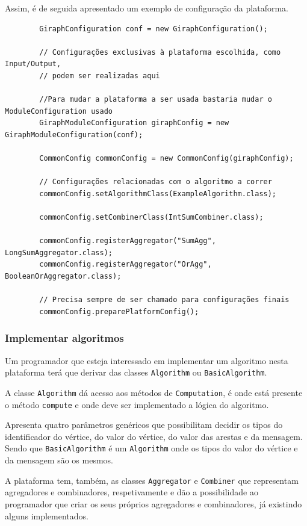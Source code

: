Assim, é de seguida apresentado um exemplo de configuração da plataforma.

\begin{verbatim}
		GiraphConfiguration conf = new GiraphConfiguration();

		// Configurações exclusivas à plataforma escolhida, como Input/Output, 
		// podem ser realizadas aqui
		
		//Para mudar a plataforma a ser usada bastaria mudar o ModuleConfiguration usado
		GiraphModuleConfiguration giraphConfig = new GiraphModuleConfiguration(conf);
		
		CommonConfig commonConfig = new CommonConfig(giraphConfig);
		
		// Configurações relacionadas com o algoritmo a correr
		commonConfig.setAlgorithmClass(ExampleAlgorithm.class);
		
		commonConfig.setCombinerClass(IntSumCombiner.class);
		
		commonConfig.registerAggregator("SumAgg", LongSumAggregator.class);
		commonConfig.registerAggregator("OrAgg", BooleanOrAggregator.class);
		
		// Precisa sempre de ser chamado para configurações finais
		commonConfig.preparePlatformConfig();
\end{verbatim}

\subsubsection*{Implementar algoritmos}
Um programador que esteja interessado em implementar um algoritmo nesta plataforma terá que derivar das classes \texttt{Algorithm} ou \texttt{BasicAlgorithm}.

A classe \texttt{Algorithm} dá acesso aos métodos de \texttt{Computation}, é onde está presente o método \texttt{compute} e onde deve ser implementado a lógica do algoritmo.

Apresenta quatro parâmetros genéricos que possibilitam decidir os tipos do identificador do vértice, do valor do vértice, do valor das arestas e da mensagem. Sendo que \texttt{BasicAlgorithm} é um \texttt{Algorithm} onde os tipos do valor do vértice e da mensagem são os mesmos.

A plataforma tem, também, as classes \texttt{Aggregator} e \texttt{Combiner} que representam agregadores e combinadores, respetivamente e dão a possibilidade ao programador que criar os seus próprios agregadores e combinadores, já existindo alguns implementados.


